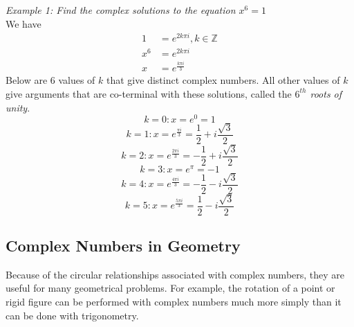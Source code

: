 \documentclass{article}
\begin{document}
            \noindent \textit{Example 1: Find the complex solutions to the equation $x^6=1$} \\
            We have \\
            \begin{align*}
                1 &= e^{2k\pi i},k\in\mathbb{Z} \\
                x^6 &= e^{2k\pi i} \\
                x &= e^{\frac{k\pi i}{3}}
            \end{align*}
            \noindent Below are 6 values of $k$ that give distinct complex numbers.
            All other values of $k$ give arguments that are co-terminal with these solutions,
            called the \textit{$6^{th}$ roots of unity}. \\

            \begin{equation*}
                k=0: x=e^0 = 1
            \end{equation*}
            \begin{equation*}
                k=1: x=e^{\frac{\pi i}{3}} = \frac{1}{2}+i\frac{\sqrt{3}}{2}
            \end{equation*}
            \begin{equation*}
                k=2: x=e^{\frac{2\pi i}{3}} = -\frac{1}{2}+i\frac{\sqrt{3}}{2}
            \end{equation*}
            \begin{equation*}
                k=3: x=e^{\pi} = -1
            \end{equation*}
            \begin{equation*}
                k=4: x=e^{\frac{4\pi i}{3}} = -\frac{1}{2}-i\frac{\sqrt{3}}{2}
            \end{equation*}
            \begin{equation*}
                k=5: x=e^{\frac{5\pi i}{3}} = \frac{1}{2} - i\frac{\sqrt{3}}{2}
            \end{equation*}


        \subsection{Complex Numbers in Geometry}
            Because of the circular relationships associated with complex numbers, they are useful
            for many geometrical problems. For example, the rotation of a point or rigid figure
            can be performed with complex numbers much more simply than it can be done with trigonometry. \\
\end{document}
